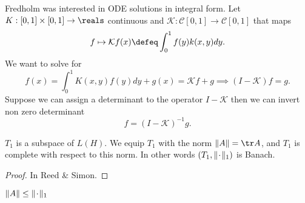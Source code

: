 Fredholm was interested in ODE solutions in integral form. Let $K:[0,1]\times [0,1] \to \reals$ continuous and $\mathcal{K}: \mathcal{C}[0,1]\to \mathcal{C}[0,1]$ that maps \[
f \mapsto \mathcal{K} f(x) \defeq \int_0^1 f(y) k(x,y)dy.
\]
We want to solve for \[
f(x) = \int_0^1 K(x,y) f(y) dy + g(x) =\mathcal{K}f + g \implies (I-\mathcal{K})f = g.
\]
Suppose we can assign a determinant to the operator $I-\mathcal{K}$ then we can invert non zero determinant \[
f=(I-\mathcal{K})^{-1}g.
\]
\newcommand*{\Z}{\makebox[1ex]{\textbf{$\cdot$}}}%
\begin{alemma}{}{}
    $T_1$ is a subspace of $L(H)$. We equip $T_1$ with the norm $\|A\|=\tr A$, and $T_1$ is complete with respect to this norm. In other words $(T_1,\|\Z\|_1)$ is Banach.
\end{alemma}
\begin{proof}
    In Reed \& Simon.
\end{proof}
\begin{remark}
    $\|A\|\leq \|\Z\|_1$
\end{remark}

